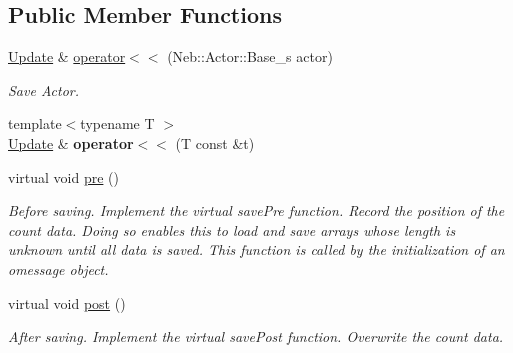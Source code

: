 \subsection*{Public Member Functions}
\begin{DoxyCompactItemize}
\item 
\hypertarget{structNeb_1_1Message_1_1Actor_1_1OUpdate_a4a04c15c17b062b23cd4c7fd52913960}{\hyperlink{structNeb_1_1Message_1_1Actor_1_1Update}{Update} \& \hyperlink{structNeb_1_1Message_1_1Actor_1_1OUpdate_a4a04c15c17b062b23cd4c7fd52913960}{operator$<$$<$} (Neb\-::\-Actor\-::\-Base\-\_\-s actor)}\label{structNeb_1_1Message_1_1Actor_1_1OUpdate_a4a04c15c17b062b23cd4c7fd52913960}

\begin{DoxyCompactList}\small\item\em Save Actor. \end{DoxyCompactList}\item 
\hypertarget{structNeb_1_1Message_1_1Actor_1_1OUpdate_ac2b8b915a2bb59ac1e44c4fe7d9cfbc7}{{\footnotesize template$<$typename T $>$ }\\\hyperlink{structNeb_1_1Message_1_1Actor_1_1Update}{Update} \& {\bfseries operator$<$$<$} (T const \&t)}\label{structNeb_1_1Message_1_1Actor_1_1OUpdate_ac2b8b915a2bb59ac1e44c4fe7d9cfbc7}

\item 
\hypertarget{structNeb_1_1Message_1_1Actor_1_1OUpdate_ad7b4c3680889ed31f6bcc2db453f61e3}{virtual void \hyperlink{structNeb_1_1Message_1_1Actor_1_1OUpdate_ad7b4c3680889ed31f6bcc2db453f61e3}{pre} ()}\label{structNeb_1_1Message_1_1Actor_1_1OUpdate_ad7b4c3680889ed31f6bcc2db453f61e3}

\begin{DoxyCompactList}\small\item\em Before saving. Implement the virtual save\-Pre function. Record the position of the count data. Doing so enables {\ttfamily this} to load and save arrays whose length is unknown until all data is saved. This function is called by the initialization of an omessage object. \end{DoxyCompactList}\item 
virtual void \hyperlink{structNeb_1_1Message_1_1Actor_1_1OUpdate_aa972a33a8c8220e7f6194e44c019d817}{post} ()
\begin{DoxyCompactList}\small\item\em After saving. Implement the virtual save\-Post function. Overwrite the count data. \end{DoxyCompactList}\end{DoxyCompactItemize}
